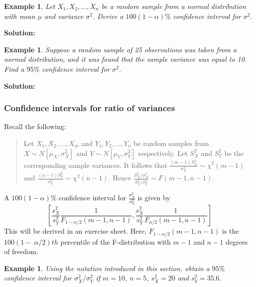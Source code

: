 \documentclass[12pt]{article}
\theoremstyle{break}
\newtheorem{example}[theorem]{Example}
\begin{document}
\begin{example}
Let $X_{1},X_{2},\ldots,X_{n}$ be a random sample from a normal distribution with mean $\mu$ and variance $\sigma^2$. Derive a $100(1-\alpha)\%$ confidence interval for $\sigma^{2}.$
\end{example}

\begin{mdframed}
{\bf Solution:}
\textcolor[rgb]{1.00,1.00,1.00}{\lipsum[1-3]}
\end{mdframed}

\begin{example}
Suppose a random sample of 25 observations was taken from a normal distribution, and it was found that the sample variance was equal to 10. Find a $95\%$ confidence interval for $\sigma^2.$
\end{example}

\begin{mdframed}
{\bf Solution:}
\textcolor[rgb]{1.00,1.00,1.00}{\lipsum[1-4]}
\end{mdframed}

\subsubsection{Confidence intervals for ratio of variances}
Recall the following:
\begin{quote}
Let $X_{1},X_{2},\ldots,X_{m}$ and $Y_{1},Y_{2},\ldots,Y_{n}$ be  random samples from $X\sim N[\mu_{X},\sigma_{X}^{2}]$ and $Y\sim N[\mu_{Y},\sigma_{Y}^{2}] $ respectively. Let $S_{X}^{2}$ and $S_{Y}^{2}$ be the corresponding sample variances. It follows that $\displaystyle \frac{(m-1)S_{X}^{2}}{\sigma_{X}^{2}} \sim \chi^{2}(m-1)$ and $\displaystyle \frac{(n-1)S_{Y}^{2}}{\sigma_{Y}^{2}} \sim \chi^{2}(n-1).$ Hence $\displaystyle \frac{S_{X}^{2}/\sigma_{X}^{2}}{S_{Y}^{2}/\sigma_{Y}^{2}} \sim F(m-1,n-1).$
\end{quote}

 A $100(1-\alpha)\%$ confidence interval for $\displaystyle \frac{\sigma_{X}^{2}}{\sigma_{Y}^{2}}$ is given by
$$
\left[\frac{s_{X}^{2}}{s_{Y}^{2}}\frac{1}{F_{1-\alpha/2}(m-1,n-1)},\frac{s_{X}^{2}}{s_{Y}^{2}}\frac{1}{F_{\alpha/2}(m-1,n-1)}\right]
$$
This will be derived in an exercise sheet. Here, $F_{1-\alpha/2}(m-1,n-1)$ is the $100(1-~\alpha/2)th$ percentile of the F-distribution with $m-1$ and $n-1$ degrees of freedom.

\begin{example}
Using the notation introduced in this section, obtain a $95\%$ confidence interval for $\sigma_{X}^{2}/\sigma_{Y}^{2}$ if $m=10$, $n=5$, $s_{X}^{2}=20$ and $s_{Y}^{2}=35.6.$
\end{example}
\end{document}
